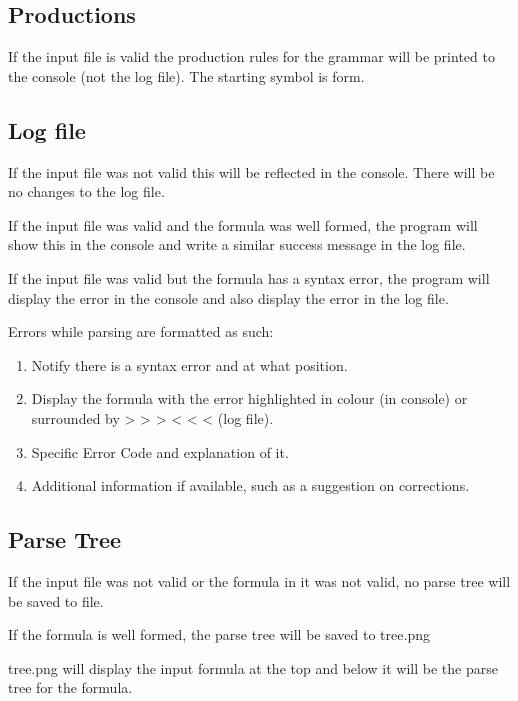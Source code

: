 \documentclass[11pt,a4paper]{article}
\begin{document}
\subsection{Productions}
If the input file is valid the production rules for the grammar will be printed to the console (not the log file). The starting symbol is form.

\subsection{Log file}

If the input file was not valid this will be reflected in the console. There will be no changes to the log file.

If the input file was valid and the formula was well formed, the program will show this in the console and write a similar success message in the log file.

If the input file was valid but the formula has a syntax error, the program will display the error in the console and also display the error in the log file.

Errors while parsing are formatted as such:
\begin{enumerate}
    \item Notify there is a syntax error and at what position.
    \item Display the formula with the error highlighted in colour (in console) or surrounded by > > > < < < (log file).
    \item Specific Error Code and explanation of it.
    \item Additional information if available, such as a suggestion on corrections.
\end{enumerate}

\subsection{Parse Tree}

If the input file was not valid or the formula in it was not valid, no parse tree will be saved to file.

If the formula is well formed, the parse tree will be saved to tree.png

tree.png will display the input formula at the top and below it will be the parse tree for the formula.
\end{document}
